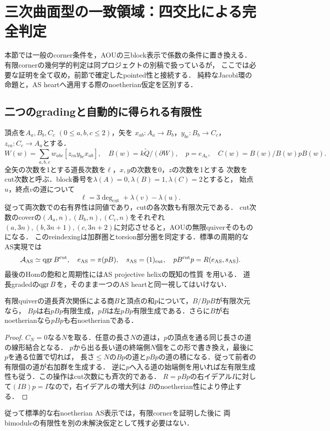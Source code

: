\section{三次曲面型の一致領域：四交比による完全判定}\label{sec:explicitcorner}
本節では一般のcorner条件を，AOUの三block表示で係数の条件に置き換える．
有限cornerの幾何学的判定は同プロジェクトの別稿で扱っているが，
ここでは必要な証明を全て収め，前節で確定したpointed性と接続する．
純粋なJacobi環の命題と，AS heartへ適用する際のnoetherian仮定を区別する．

\subsection{二つのgradingと自動的に得られる有限性}
頂点を$A_a,B_b,C_c$ $(0\le a,b,c\le2)$，矢を
$x_{ab}:A_a\to B_b$，$y_{bc}:B_b\to C_c$，$z_{ca}:C_c\to A_a$とする．
\[
 W(w)=\sum_{a,b,c}w_{abc}[z_{ca}y_{bc}x_{ab}],\quad
 B(w)=k\widetilde Q/(\partial W),\quad p=e_{A_0},\quad C(w)=B(w)/B(w)pB(w).
\]
全矢の次数を1とする道長次数を$\ell$，$x,y$の次数を0，$z$の次数を1とする
次数をcut次数と呼ぶ．block番号を$\lambda(A)=0,\lambda(B)=1,\lambda(C)=2$とすると，
始点$u$，終点$v$の道について
\begin{equation}\label{eq:cutpath}
 \ell=3\deg_{\mathrm{cut}}+\lambda(v)-\lambda(u).
\end{equation}
従って両次数での右有界性は同値であり，cutの各次数も有限次元である．
cut次数のcoverの$(A_a,n),(B_b,n),(C_c,n)$をそれぞれ
$(a,3n),(b,3n+1),(c,3n+2)$に対応させると，AOUの無限quiverそのものになる．
このreindexingは加群圏とtorsion部分圏を同定する．標準の周期的なAS実現では
\begin{equation}\label{eq:explicitfold}
 \mathcal A_{\mathrm{AS}}\simeq\operatorname{qgr} B^{\mathrm{cut}},\quad
 e_{\mathrm{AS}}=\pi(pB),\quad s_{\mathrm{AS}}=(1)_{\mathrm{cut}},\quad
 pB^{\mathrm{cut}}p=R(e_{\mathrm{AS}},s_{\mathrm{AS}}).
\end{equation}
最後のHomの飽和と周期性にはAS projective helixの既知の性質
\cite[\S4]{AOU}\cite[(3.9)--(3.10), Remark 5.4]{OU}を用いる．
道長gradedの$\operatorname{qgr} B$を，そのまま一つのAS heartと同一視してはいけない．

\begin{lemma}[有限cornerから両bimoduleの有限性へ]\label{lem:automaticcorner}
有限quiverの道長斉次関係による商$B$と頂点の和$p$について，$B/BpB$が有限次元なら，
$Bp$は右$pBp$有限生成，$pB$は左$pBp$有限生成である．さらに$B$が右noetherianなら$pBp$も右noetherianである．
\end{lemma}
\begin{proof}
$C_N=0$なる$N$を取る．任意の長さ$N$の道は，$p$の頂点を通る同じ長さの道の線形結合となる．
$p$から出る長い道の終端側$N$個をこの形で書き換え，最後に$p$を通る位置で切れば，
長さ$\le N$の$Bp$の道と$pBp$の道の積になる．従って前者の有限個の道が右加群を生成する．
逆に$p$へ入る道の始端側を用いれば左有限生成性も従う．この操作はcut次数にも斉次的である．
$R=pBp$の右イデアル$I$に対して$(IB)p=I$なので，右イデアルの増大列は
$B$のnoetherian性により停止する．
\end{proof}
従って標準的な右noetherian AS表示では，有限cornerを証明した後に
両bimoduleの有限性を別の未解決仮定として残す必要はない．

